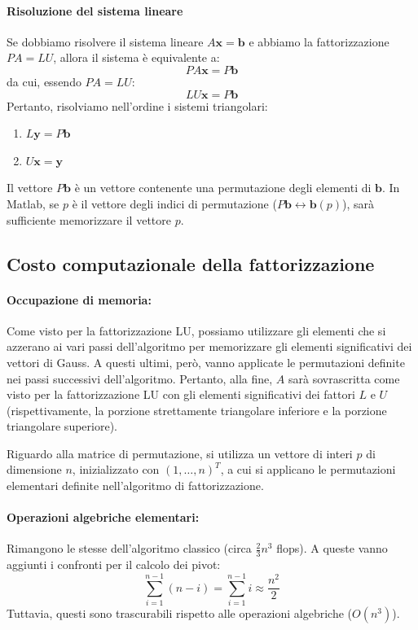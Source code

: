 \paragraph{Risoluzione del sistema lineare}
Se dobbiamo risolvere il sistema lineare $A\mathbf{x} = \mathbf{b}$ e abbiamo la fattorizzazione $PA=LU$, allora il sistema è equivalente a:
$$ P A \mathbf{x} = P \mathbf{b} $$
da cui, essendo $PA=LU$:
$$ L U \mathbf{x} = P \mathbf{b} $$
Pertanto, risolviamo nell'ordine i sistemi triangolari:
\begin{enumerate}
    \item $L \mathbf{y} = P \mathbf{b}$
    \item $U \mathbf{x} = \mathbf{y}$
\end{enumerate}
\begin{osservazione}
Il vettore $P\mathbf{b}$ è un vettore contenente una permutazione degli elementi di $\mathbf{b}$. In Matlab, se $p$ è il vettore degli indici di permutazione ($P\mathbf{b} \leftrightarrow \mathbf{b}(p)$), sarà sufficiente memorizzare il vettore $p$.
\end{osservazione}

\subsection{Costo computazionale della fattorizzazione}
\paragraph{Occupazione di memoria:}
Come visto per la fattorizzazione LU, possiamo utilizzare gli elementi che si azzerano ai vari passi dell'algoritmo per memorizzare gli elementi significativi dei vettori di Gauss.
A questi ultimi, però, vanno applicate le permutazioni definite nei passi successivi dell'algoritmo. Pertanto, alla fine, $A$ sarà sovrascritta come visto per la fattorizzazione LU con gli elementi significativi dei fattori $L$ e $U$ (rispettivamente, la porzione strettamente triangolare inferiore e la porzione triangolare superiore).

Riguardo alla matrice di permutazione, si utilizza un vettore di interi $p$ di dimensione $n$, inizializzato con $(1, \dots, n)^T$, a cui si applicano le permutazioni elementari definite nell'algoritmo di fattorizzazione.

\paragraph{Operazioni algebriche elementari:}
Rimangono le stesse dell'algoritmo classico (circa $\frac{2}{3}n^3$ flops).
A queste vanno aggiunti i confronti per il calcolo dei pivot:
$$ \sum_{i=1}^{n-1} (n-i) = \sum_{i=1}^{n-1} i \approx \frac{n^2}{2} $$
Tuttavia, questi sono trascurabili rispetto alle operazioni algebriche ($O(n^3)$).

